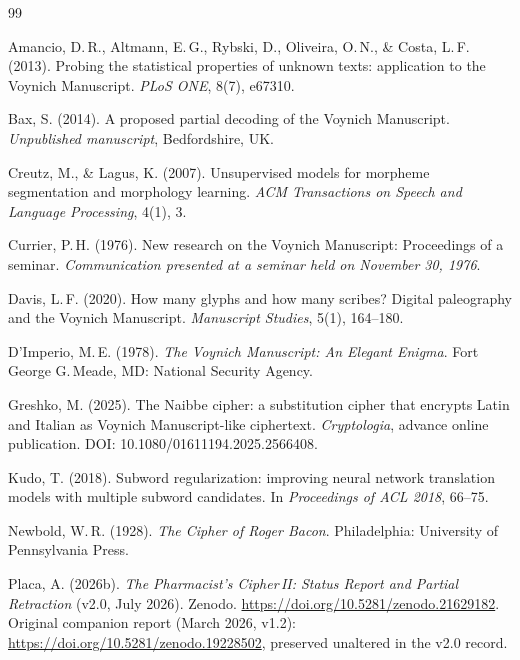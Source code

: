 \documentclass[11pt,a4paper]{article}
\begin{document}
\begin{thebibliography}{99}

Amancio, D.\,R., Altmann, E.\,G., Rybski, D., Oliveira, O.\,N., \& Costa, L.\,F. (2013).
\newblock Probing the statistical properties of unknown texts: application to the Voynich Manuscript.
\newblock \textit{PLoS ONE}, 8(7), e67310.

Bax, S. (2014).
\newblock A proposed partial decoding of the Voynich Manuscript.
\newblock \textit{Unpublished manuscript}, Bedfordshire, UK.

Creutz, M., \& Lagus, K. (2007).
\newblock Unsupervised models for morpheme segmentation and morphology learning.
\newblock \textit{ACM Transactions on Speech and Language Processing}, 4(1), 3.

Currier, P.\,H. (1976).
\newblock New research on the Voynich Manuscript: Proceedings of a seminar.
\newblock \textit{Communication presented at a seminar held on November 30, 1976}.

Davis, L.\,F. (2020).
\newblock How many glyphs and how many scribes? Digital paleography and the Voynich Manuscript.
\newblock \textit{Manuscript Studies}, 5(1), 164--180.

D'Imperio, M.\,E. (1978).
\newblock \textit{The Voynich Manuscript: An Elegant Enigma}.
\newblock Fort George G.\,Meade, MD: National Security Agency.

Greshko, M. (2025).
\newblock The Naibbe cipher: a substitution cipher that encrypts Latin and Italian as Voynich Manuscript-like ciphertext.
\newblock \textit{Cryptologia}, advance online publication. DOI: 10.1080/01611194.2025.2566408.

Kudo, T. (2018).
\newblock Subword regularization: improving neural network translation models with multiple subword candidates.
\newblock In \textit{Proceedings of ACL 2018}, 66--75.

Newbold, W.\,R. (1928).
\newblock \textit{The Cipher of Roger Bacon}.
\newblock Philadelphia: University of Pennsylvania Press.

Placa, A. (2026b).
\newblock \textit{The Pharmacist's Cipher\,II: Status Report and Partial Retraction} (v2.0, July 2026).
\newblock Zenodo. \url{https://doi.org/10.5281/zenodo.21629182}. Original companion report (March 2026, v1.2): \url{https://doi.org/10.5281/zenodo.19228502}, preserved unaltered in the v2.0 record.


\end{thebibliography}
\end{document}
